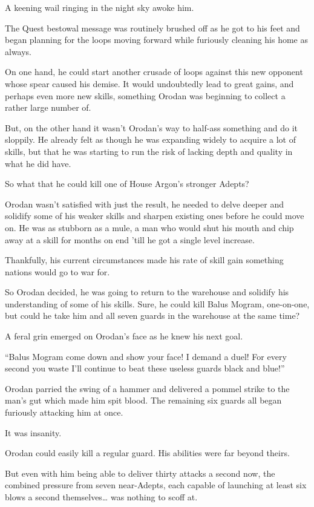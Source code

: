 \documentclass[a4paper,10pt]{book}
\begin{document}
A keening wail ringing in the night sky awoke him.\par
The Quest bestowal message was routinely brushed off as he got to his feet and began planning for the loops moving forward while furiously cleaning his home as always.\par
On one hand, he could start another crusade of loops against this new opponent whose spear caused his demise. It would undoubtedly lead to great gains, and perhaps even more new skills, something Orodan was beginning to collect a rather large number of.\par
But, on the other hand it wasn’t Orodan’s way to half-ass something and do it sloppily. He already felt as though he was expanding widely to acquire a lot of skills, but that he was starting to run the risk of lacking depth and quality in what he did have.\par
So what that he could kill one of House Argon’s stronger Adepts?\par
Orodan wasn’t satisfied with just the result, he needed to delve deeper and solidify some of his weaker skills and sharpen existing ones before he could move on. He was as stubborn as a mule, a man who would shut his mouth and chip away at a skill for months on end 'till he got a single level increase.\par
Thankfully, his current circumstances made his rate of skill gain something nations would go to war for.\par
So Orodan decided, he was going to return to the warehouse and solidify his understanding of some of his skills. Sure, he could kill Balus Mogram, one-on-one, but could he take him and all seven guards in the warehouse at the same time?\par
A feral grin emerged on Orodan’s face as he knew his next goal.\par
\par
“Balus Mogram come down and show your face! I demand a duel! For every second you waste I’ll continue to beat these useless guards black and blue!”\par
Orodan parried the swing of a hammer and delivered a pommel strike to the man’s gut which made him spit blood. The remaining six guards all began furiously attacking him at once.\par
It was insanity.\par
Orodan could easily kill a regular guard. His abilities were far beyond theirs.\par
But even with him being able to deliver thirty attacks a second now, the combined pressure from seven near-Adepts, each capable of launching at least six blows a second themselves… was nothing to scoff at.\par
\end{document}
